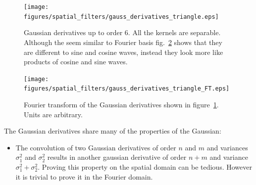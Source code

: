 \begin{figure}
	\centerline{
		\texttt{[image: figures/spatial\_filters/gauss\_derivatives\_triangle.eps]}}
	\caption{Gaussian derivatives up to order 6. All the kernels are separable. Although the seem similar to Fourier basis fig.~\ref{fig:gauss_derivatives_triangle_FT} shows that they are different to sine and cosine waves, instead they look more like products of cosine and sine waves.}
	\label{fig:gauss_derivatives_triangle}
\end{figure}


\begin{figure}
	\centerline{
		\texttt{[image: figures/spatial\_filters/gauss\_derivatives\_triangle\_FT.eps]}}
	\caption{Fourier transform of the Gaussian derivatives shown in figure~\ref{fig:gauss_derivatives_triangle}. Units are arbitrary.}
	\label{fig:gauss_derivatives_triangle_FT}
\end{figure}


The Gaussian derivatives share many of the properties of the Gaussian:
\begin{itemize}
	\item The convolution of two Gaussian derivatives of order $n$ and $m$ and variances $\sigma_1^2$ and $\sigma_2^2$ results in another gaussian derivative of order $n+m$ and variance $\sigma_1^2 + \sigma_2^2$. Proving this property on the spatial domain can be tedious. However it is trivial to prove it in the Fourier domain.
\end{itemize}



